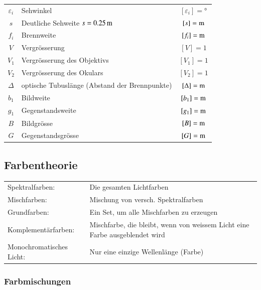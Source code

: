 \begin{tabular}{c l c}
	$\varepsilon_i$ & Sehwinkel & $[\varepsilon_i] =$° \\
	$s$ & Deutliche Sehweite $s =0.25 \, \mathrm{m}$ & $[s] = \mathrm{m}$ \\
	$f_i$ & Brennweite & $[f_i] = \mathrm{m}$ \\
	$V$ & Vergrösserung & $[V] = 1$ \\
	$V_1$ & Vergrösserung des Objektivs & $[V_1] = 1$ \\
	$V_2$ & Vergrösserung des Okulars & $[V_2] = 1$ \\
	$\Delta$ & optische Tubuslänge (Abstand der Brennpunkte) & $[\Delta] = \mathrm{m}$ \\
	$b_1$ & Bildweite & $[b_1] = \mathrm{m}$ \\
	$g_1$ & Gegenstandsweite & $[g_1] = \mathrm{m}$ \\
	$B$ & Bildgrösse & $[B] = \mathrm{m}$ \\
	$G$ & Gegenstandsgrösse & $[G] = \mathrm{m}$
\end{tabular}






\subsection{Farbentheorie}

\begin{tabularx}{\linewidth}{lX}
	Spektralfarben: & Die gesamten Lichtfarben \\
	Mischfarben:    & Mischung von versch. Spektralfarben \\
	Grundfarben:    & Ein Set, um alle Mischfarben zu erzeugen \\
	Komplementärfarben: & Mischfarbe, die bleibt, wenn von weissem Licht eine Farbe ausgeblendet wird \\
	Monochromatisches Licht: & Nur eine einzige Wellenlänge (Farbe) 
\end{tabularx}



\subsubsection{Farbmischungen}

